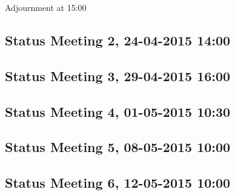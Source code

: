 Adjournment at 15:00

\subsection{Status Meeting 2, 24-04-2015 14:00}


\subsection{Status Meeting 3, 29-04-2015 16:00}


\subsection{Status Meeting 4, 01-05-2015 10:30}


\subsection{Status Meeting 5, 08-05-2015 10:00}


\subsection{Status Meeting 6, 12-05-2015 10:00}
